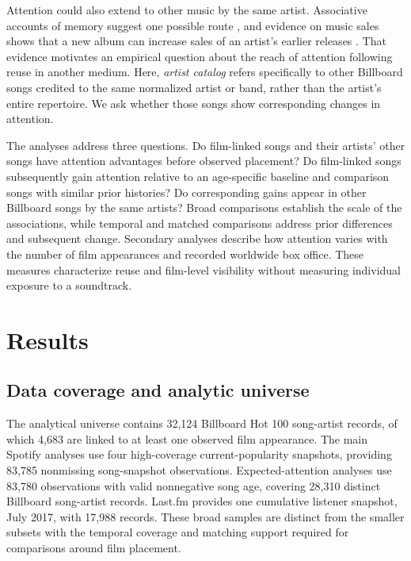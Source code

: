 \documentclass[10pt]{article}
\begin{document}
Attention could also extend to other music by the same artist. Associative accounts of memory suggest one possible route \citep{collins1975spreading,Hirst2018}, and evidence on music sales shows that a new album can increase sales of an artist's earlier releases \citep{HendricksSorensen2009}. That evidence motivates an empirical question about the reach of attention following reuse in another medium. Here, \emph{artist catalog} refers specifically to other Billboard songs credited to the same normalized artist or band, rather than the artist's entire repertoire. We ask whether those songs show corresponding changes in attention.

The analyses address three questions. Do film-linked songs and their artists' other songs have attention advantages before observed placement? Do film-linked songs subsequently gain attention relative to an age-specific baseline and comparison songs with similar prior histories? Do corresponding gains appear in other Billboard songs by the same artists? Broad comparisons establish the scale of the associations, while temporal and matched comparisons address prior differences and subsequent change. Secondary analyses describe how attention varies with the number of film appearances and recorded worldwide box office. These measures characterize reuse and film-level visibility without measuring individual exposure to a soundtrack.

\section*{Results}

\subsection*{Data coverage and analytic universe}

The analytical universe contains 32,124 Billboard Hot 100 song-artist records, of which 4,683 are linked to at least one observed film appearance. The main Spotify analyses use four high-coverage current-popularity snapshots, providing 83,785 nonmissing song-snapshot observations. Expected-attention analyses use 83,780 observations with valid nonnegative song age, covering 28,310 distinct Billboard song-artist records. Last.fm provides one cumulative listener snapshot, July 2017, with 17,988 records. These broad samples are distinct from the smaller subsets with the temporal coverage and matching support required for comparisons around film placement.
\end{document}
